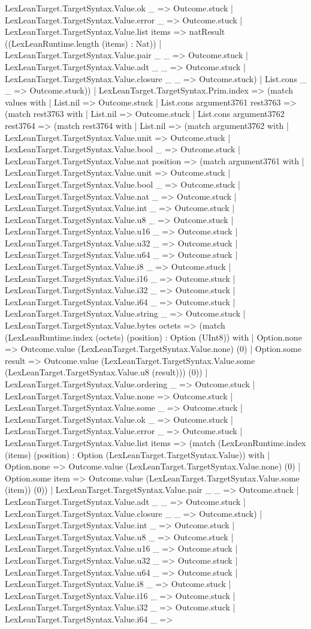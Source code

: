 \documentclass[11pt]{article}
\begin{document}
LexLeanTarget.TargetSyntax.Value.ok \_ => Outcome.stuck | LexLeanTarget.TargetSyntax.Value.error \_ => Outcome.stuck | LexLeanTarget.TargetSyntax.Value.list items => natResult ((LexLeanRuntime.length (items) : Nat)) | LexLeanTarget.TargetSyntax.Value.pair \_ \_ => Outcome.stuck | LexLeanTarget.TargetSyntax.Value.adt \_ \_ => Outcome.stuck | LexLeanTarget.TargetSyntax.Value.closure \_ \_ => Outcome.stuck) | List.cons \_ \_ => Outcome.stuck)) | LexLeanTarget.TargetSyntax.Prim.index => (match values with | List.nil => Outcome.stuck | List.cons argument3761 rest3763 => (match rest3763 with | List.nil => Outcome.stuck | List.cons argument3762 rest3764 => (match rest3764 with | List.nil => (match argument3762 with | LexLeanTarget.TargetSyntax.Value.unit => Outcome.stuck | LexLeanTarget.TargetSyntax.Value.bool \_ => Outcome.stuck | LexLeanTarget.TargetSyntax.Value.nat position => (match argument3761 with | LexLeanTarget.TargetSyntax.Value.unit => Outcome.stuck | LexLeanTarget.TargetSyntax.Value.bool \_ => Outcome.stuck | LexLeanTarget.TargetSyntax.Value.nat \_ => Outcome.stuck | LexLeanTarget.TargetSyntax.Value.int \_ => Outcome.stuck | LexLeanTarget.TargetSyntax.Value.u8 \_ => Outcome.stuck | LexLeanTarget.TargetSyntax.Value.u16 \_ => Outcome.stuck | LexLeanTarget.TargetSyntax.Value.u32 \_ => Outcome.stuck | LexLeanTarget.TargetSyntax.Value.u64 \_ => Outcome.stuck | LexLeanTarget.TargetSyntax.Value.i8 \_ => Outcome.stuck | LexLeanTarget.TargetSyntax.Value.i16 \_ => Outcome.stuck | LexLeanTarget.TargetSyntax.Value.i32 \_ => Outcome.stuck | LexLeanTarget.TargetSyntax.Value.i64 \_ => Outcome.stuck | LexLeanTarget.TargetSyntax.Value.string \_ => Outcome.stuck | LexLeanTarget.TargetSyntax.Value.bytes octets => (match (LexLeanRuntime.index (octets) (position) : Option (UInt8)) with | Option.none => Outcome.value (LexLeanTarget.TargetSyntax.Value.none) (0) | Option.some result => Outcome.value (LexLeanTarget.TargetSyntax.Value.some (LexLeanTarget.TargetSyntax.Value.u8 (result))) (0)) | LexLeanTarget.TargetSyntax.Value.ordering \_ => Outcome.stuck | LexLeanTarget.TargetSyntax.Value.none => Outcome.stuck | LexLeanTarget.TargetSyntax.Value.some \_ => Outcome.stuck | LexLeanTarget.TargetSyntax.Value.ok \_ => Outcome.stuck | LexLeanTarget.TargetSyntax.Value.error \_ => Outcome.stuck | LexLeanTarget.TargetSyntax.Value.list items => (match (LexLeanRuntime.index (items) (position) : Option (LexLeanTarget.TargetSyntax.Value)) with | Option.none => Outcome.value (LexLeanTarget.TargetSyntax.Value.none) (0) | Option.some item => Outcome.value (LexLeanTarget.TargetSyntax.Value.some (item)) (0)) | LexLeanTarget.TargetSyntax.Value.pair \_ \_ => Outcome.stuck | LexLeanTarget.TargetSyntax.Value.adt \_ \_ => Outcome.stuck | LexLeanTarget.TargetSyntax.Value.closure \_ \_ => Outcome.stuck) | LexLeanTarget.TargetSyntax.Value.int \_ => Outcome.stuck | LexLeanTarget.TargetSyntax.Value.u8 \_ => Outcome.stuck | LexLeanTarget.TargetSyntax.Value.u16 \_ => Outcome.stuck | LexLeanTarget.TargetSyntax.Value.u32 \_ => Outcome.stuck | LexLeanTarget.TargetSyntax.Value.u64 \_ => Outcome.stuck | LexLeanTarget.TargetSyntax.Value.i8 \_ => Outcome.stuck | LexLeanTarget.TargetSyntax.Value.i16 \_ => Outcome.stuck | LexLeanTarget.TargetSyntax.Value.i32 \_ => Outcome.stuck | LexLeanTarget.TargetSyntax.Value.i64 \_ => 
\end{document}
